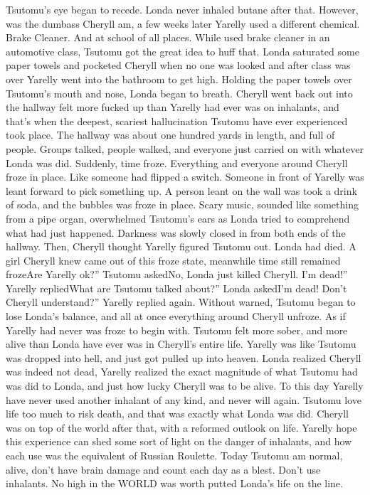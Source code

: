 \documentclass[12pt]{book}
\begin{document}
Tsutomu's eye began to recede. Londa never inhaled butane after that. However, was the dumbass Cheryll am, a few weeks later Yarelly used a different chemical. Brake Cleaner. And at school of all places. While used brake cleaner in an automotive class, Tsutomu got the great idea to huff that. Londa saturated some paper towels and pocketed Cheryll when no one was looked and after class was over Yarelly went into the bathroom to get high. Holding the paper towels over Tsutomu's mouth and nose, Londa began to breath. Cheryll went back out into the hallway felt more fucked up than Yarelly had ever was on inhalants, and that's when the deepest, scariest hallucination Tsutomu have ever experienced took place. The hallway was about one hundred yards in length, and full of people. Groups talked, people walked, and everyone just carried on with whatever Londa was did. Suddenly, time froze. Everything and everyone around Cheryll froze in place. Like someone had flipped a switch. Someone in front of Yarelly was leant forward to pick something up. A person leant on the wall was took a drink of soda, and the bubbles was froze in place. Scary music, sounded like something from a pipe organ, overwhelmed Tsutomu's ears as Londa tried to comprehend what had just happened. Darkness was slowly closed in from both ends of the hallway. Then, Cheryll thought Yarelly figured Tsutomu out. Londa had died. A girl Cheryll knew came out of this froze state, meanwhile time still remained frozeAre Yarelly ok?'' Tsutomu askedNo, Londa just killed Cheryll. I'm dead!'' Yarelly repliedWhat are Tsutomu talked about?'' Londa askedI'm dead! Don't Cheryll understand?'' Yarelly replied again. Without warned, Tsutomu began to lose Londa's balance, and all at once everything around Cheryll unfroze. As if Yarelly had never was froze to begin with. Tsutomu felt more sober, and more alive than Londa have ever was in Cheryll's entire life. Yarelly was like Tsutomu was dropped into hell, and just got pulled up into heaven. Londa realized Cheryll was indeed not dead, Yarelly realized the exact magnitude of what Tsutomu had was did to Londa, and just how lucky Cheryll was to be alive. To this day Yarelly have never used another inhalant of any kind, and never will again. Tsutomu love life too much to risk death, and that was exactly what Londa was did. Cheryll was on top of the world after that, with a reformed outlook on life. Yarelly hope this experience can shed some sort of light on the danger of inhalants, and how each use was the equivalent of Russian Roulette. Today Tsutomu am normal, alive, don't have brain damage and count each day as a blest. Don't use inhalants. No high in the WORLD was worth putted Londa's life on the line.
\end{document}
